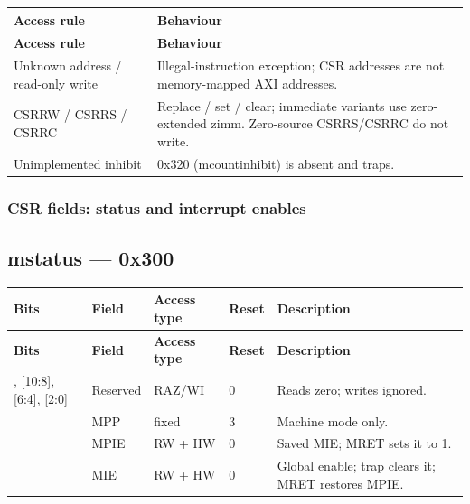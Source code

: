 \documentclass[11pt]{article}
\begin{document}
{\small
\begin{longtable}{@{}L{0.3400\dimexpr\linewidth-12pt\relax}L{0.6600\dimexpr\linewidth-12pt\relax}@{}}
\toprule
\textbf{Access rule} & \textbf{Behaviour} \\ \midrule
\endfirsthead
\toprule
\textbf{Access rule} & \textbf{Behaviour} \\ \midrule
\endhead
Unknown address / read-only write & Illegal-instruction exception; CSR addresses are not memory-mapped AXI addresses. \\ \addlinespace[3pt]
CSRRW / CSRRS / CSRRC & Replace / set / clear; immediate variants use zero-extended zimm. Zero-source CSRRS/CSRRC do not write. \\ \addlinespace[3pt]
Unimplemented inhibit & 0x320 (mcountinhibit) is absent and traps. \\*
\bottomrule\end{longtable}}

\subsubsection{CSR fields: status and interrupt enables}
\subsection*{mstatus — 0x300}
{\small
\begin{longtable}{@{}L{0.1200\dimexpr\linewidth-48pt\relax}L{0.1800\dimexpr\linewidth-48pt\relax}L{0.1200\dimexpr\linewidth-48pt\relax}L{0.1200\dimexpr\linewidth-48pt\relax}L{0.4600\dimexpr\linewidth-48pt\relax}@{}}
\toprule
\textbf{Bits} & \textbf{Field} & \textbf{Access type} & \textbf{Reset} & \textbf{Description} \\ \midrule
\endfirsthead
\toprule
\textbf{Bits} & \textbf{Field} & \textbf{Access type} & \textbf{Reset} & \textbf{Description} \\ \midrule
\endhead
[31:13], [10:8], [6:4], [2:0] & Reserved & RAZ/WI & 0 & Reads zero; writes ignored. \\ \addlinespace[3pt]
[12:11] & MPP & fixed & 3 & Machine mode only. \\ \addlinespace[3pt]
[7] & MPIE & RW + HW & 0 & Saved MIE; MRET sets it to 1. \\ \addlinespace[3pt]
[3] & MIE & RW + HW & 0 & Global enable; trap clears it; MRET restores MPIE. \\*
\bottomrule\end{longtable}}
\end{document}
